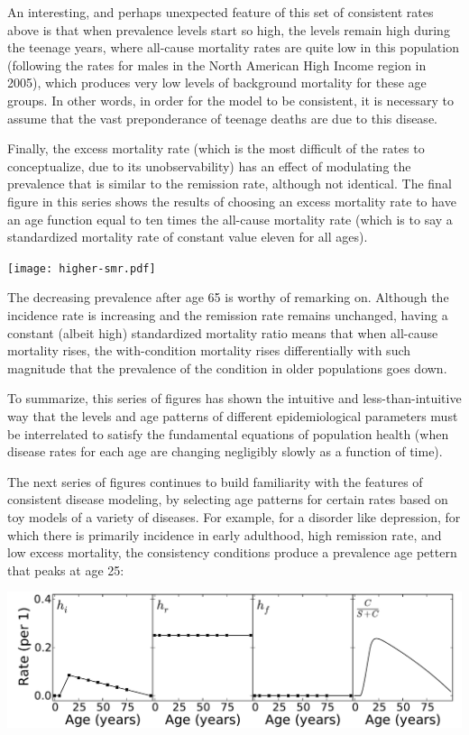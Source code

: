 An interesting, and perhaps unexpected feature of this set of
consistent rates above is that when prevalence levels start so high,
the levels remain high during the teenage years, where all-cause
mortality rates are quite low in this population (following the rates
for males in the North American High Income region in 2005), which
produces very low levels of background mortality for these age
groups. In other words, in order for the model to be consistent, it is
necessary to assume that the vast preponderance of teenage deaths are
due to this disease.

Finally, the excess mortality rate (which is the most difficult of the
rates to conceptualize, due to its unobservability) has an effect of
modulating the prevalence that is similar to the remission rate,
although not identical.  The final figure in this series shows the
results of choosing an excess mortality rate to have an age function
equal to ten times the all-cause mortality rate (which is to say a
standardized mortality rate of constant value eleven for all ages).

\texttt{[image: higher-smr.pdf]}

The decreasing prevalence after age 65 is worthy of remarking
on. Although the incidence rate is increasing and the remission rate
remains unchanged, having a constant (albeit high) standardized
mortality ratio means that when all-cause mortality rises, the
with-condition mortality rises differentially with such magnitude that
the prevalence of the condition in older populations goes down.

To summarize, this series of figures has shown the intuitive and
less-than-intuitive way that the levels and age patterns of different
epidemiological parameters must be interrelated to satisfy the
fundamental equations of population health (when disease rates for
each age are changing negligibly slowly as a function of time).

The next series of figures continues to build familiarity with the
features of consistent disease modeling, by selecting age patterns for
certain rates based on toy models of a variety of diseases.  For
example, for a disorder like depression, for which there is primarily
incidence in early adulthood, high remission rate, and low excess
mortality, the consistency conditions produce a prevalence age pettern
that peaks at age 25: 

\includegraphics[width=\textwidth]{forward-sim-mental.pdf}


